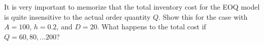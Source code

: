 \begin{exercise}
  It is very important to memorize that the total inventory cost for
  the EOQ model is quite insensitive to the actual order quantity
  $Q$. Show this for the case with $A=100$, $h=0.2$, and $D=20$. What
  happens to the total cost if $Q=60, 80, \ldots 200$?

\end{exercise}

